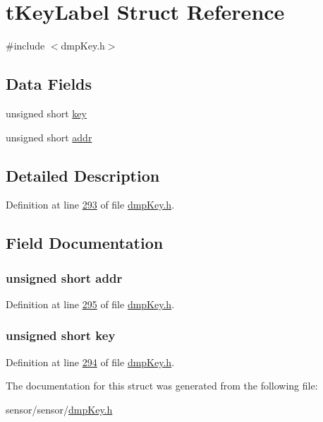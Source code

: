 \hypertarget{structt_key_label}{}\section{t\+Key\+Label Struct Reference}
\label{structt_key_label}


{\ttfamily \#include $<$dmp\+Key.\+h$>$}

\subsection*{Data Fields}
\begin{DoxyCompactItemize}
\item 
unsigned short \hyperlink{structt_key_label_ad42a2de4cc8381513f980278161372bb}{key}
\item 
unsigned short \hyperlink{structt_key_label_af2d98bb0b152ca3d254d1c534236c2e6}{addr}
\end{DoxyCompactItemize}


\subsection{Detailed Description}


Definition at line \hyperlink{dmp_key_8h_source_l00293}{293} of file \hyperlink{dmp_key_8h_source}{dmp\+Key.\+h}.



\subsection{Field Documentation}
\subsubsection[{\texorpdfstring{addr}{addr}}]{\setlength{\rightskip}{0pt plus 5cm}unsigned short addr}\hypertarget{structt_key_label_af2d98bb0b152ca3d254d1c534236c2e6}{}\label{structt_key_label_af2d98bb0b152ca3d254d1c534236c2e6}


Definition at line \hyperlink{dmp_key_8h_source_l00295}{295} of file \hyperlink{dmp_key_8h_source}{dmp\+Key.\+h}.

\subsubsection[{\texorpdfstring{key}{key}}]{\setlength{\rightskip}{0pt plus 5cm}unsigned short key}\hypertarget{structt_key_label_ad42a2de4cc8381513f980278161372bb}{}\label{structt_key_label_ad42a2de4cc8381513f980278161372bb}


Definition at line \hyperlink{dmp_key_8h_source_l00294}{294} of file \hyperlink{dmp_key_8h_source}{dmp\+Key.\+h}.



The documentation for this struct was generated from the following file\+:\begin{DoxyCompactItemize}
\item 
sensor/sensor/\hyperlink{dmp_key_8h}{dmp\+Key.\+h}\end{DoxyCompactItemize}
